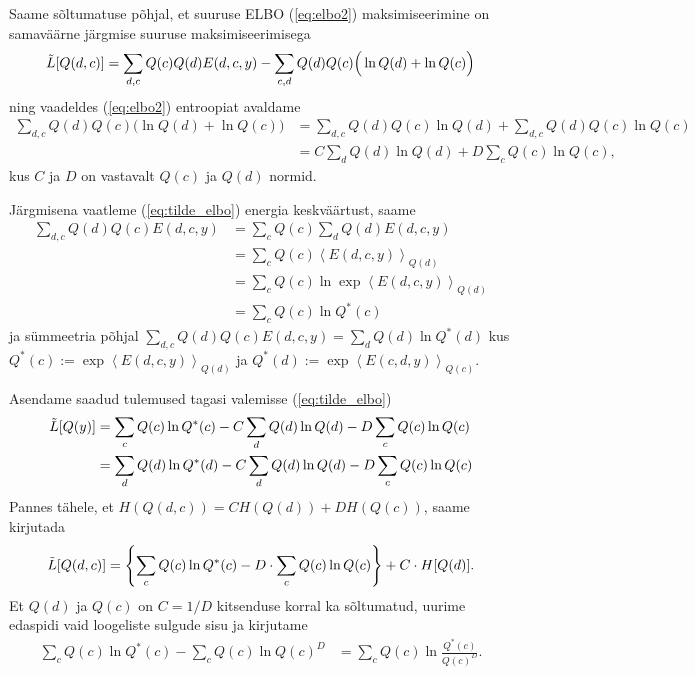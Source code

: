 Saame sõltumatuse põhjal, et suuruse ELBO (\ref{eq:elbo2}) maksimiseerimine on samaväärne järgmise suuruse maksimiseerimisega
\begin{equation}
    \label{eq:tilde_elbo}
    \Tilde{L}[Q(d, c)] = \sum_{d, c}  Q(c) Q(d) E(d, c, y) - \sum_{c, d} Q(d) Q(c) \Big(\ln Q(d) + \ln Q(c) \Big)
\end{equation}
ning vaadeldes (\ref{eq:elbo2}) entroopiat avaldame
\begin{align*}
    \sum_{d, c} Q(d) Q(c) \Big(\ln Q(d) + \ln Q(c) \Big) &= \sum_{d, c} Q(d) Q(c) \ln Q(d) + \sum_{d, c} Q(d) Q(c) \ln Q(c) \\
    &= C \sum_{d} Q(d)  \ln Q(d) + D \sum_{c} Q(c)  \ln Q(c),
\end{align*}
kus $C$ ja $D$ on vastavalt $Q(c)$ ja $Q(d)$ normid.

Järgmisena vaatleme (\ref{eq:tilde_elbo}) energia keskväärtust, saame
\begin{align*}
     \sum_{d, c} Q(d) Q(c) E(d, c, y) & =  \sum_{c} Q(c) \sum_{d} Q(d) E(d, c, y) \\
    & = \sum_{c} Q(c) \left< E(d, c, y) \right>_{Q(d)} \\
    & = \sum_{c} Q(c) \ln \exp \left< E(d, c, y) \right>_{Q(d)} \\
    & =  \sum_{c} Q(c) \ln Q^*(c)
\end{align*}
ja sümmeetria põhjal $\sum_{d, c} Q(d) Q(c) E(d, c, y) =  \sum_{d} Q(d) \ln Q^*(d) $
kus $Q^*(c) := \exp \left< E(d, c, y) \right>_{Q(d)}$ ja $Q^*(d) := \exp \left< E(c, d, y) \right>_{Q(c)}$. 

Asendame saadud tulemused tagasi valemisse (\ref{eq:tilde_elbo})
\begin{align*}
     \Tilde{L}[Q(y)] &=  \sum_{c} Q(c) \ln Q^*(c) - C \sum_{d} Q(d)  \ln Q(d) - D \sum_{c} Q(c)  \ln Q(c)\\
     &= \sum_{d} Q(d) \ln Q^*(d) - C \sum_{d} Q(d)  \ln Q(d) - D \sum_{c} Q(c)  \ln Q(c)
\end{align*}
Pannes tähele, et $H(Q(d, c)) = C H(Q(d)) + D H(Q(c))$, saame kirjutada
\begin{equation*}
\Tilde{L}[Q(d, c)]= \left\{ \sum_{c} Q(c) \ln Q^*(c) - D \cdot \sum_{c} Q(c) \ln Q(c) \right\} + C \cdot H [Q(d)] .    
\end{equation*}
Et $Q(d)$ ja $Q(c)$ on $C = 1/D$ kitsenduse korral ka sõltumatud, uurime edaspidi vaid loogeliste sulgude sisu ja kirjutame
\begin{align*}
\sum_{c} Q(c) \ln Q^*(c) - \sum_{c} Q(c) \ln Q(c)^D & =\sum_{c} Q(c) \ln \frac{Q^*(c)}{Q(c)^D}.
\end{align*}


